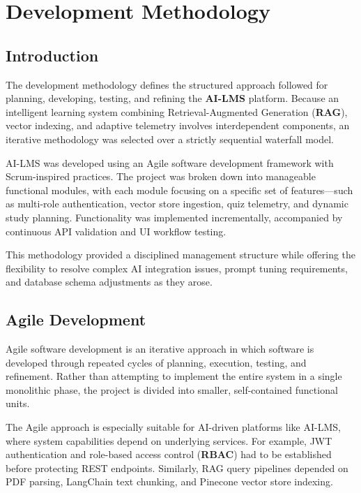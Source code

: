 \chapter{Development Methodology}

\section{Introduction}

The development methodology defines the structured approach followed for planning, developing, testing, and refining the \textbf{AI-LMS} platform. Because an intelligent learning system combining Retrieval-Augmented Generation (\textbf{RAG}), vector indexing, and adaptive telemetry involves interdependent components, an iterative methodology was selected over a strictly sequential waterfall model.

AI-LMS was developed using an Agile software development framework with Scrum-inspired practices. The project was broken down into manageable functional modules, with each module focusing on a specific set of features—such as multi-role authentication, vector store ingestion, quiz telemetry, and dynamic study planning. Functionality was implemented incrementally, accompanied by continuous API validation and UI workflow testing.

This methodology provided a disciplined management structure while offering the flexibility to resolve complex AI integration issues, prompt tuning requirements, and database schema adjustments as they arose.

\section{Agile Development}

Agile software development is an iterative approach in which software is developed through repeated cycles of planning, execution, testing, and refinement. Rather than attempting to implement the entire system in a single monolithic phase, the project is divided into smaller, self-contained functional units.

The Agile approach is especially suitable for AI-driven platforms like AI-LMS, where system capabilities depend on underlying services. For example, JWT authentication and role-based access control (\textbf{RBAC}) had to be established before protecting REST endpoints. Similarly, RAG query pipelines depended on PDF parsing, LangChain text chunking, and Pinecone vector store indexing.

